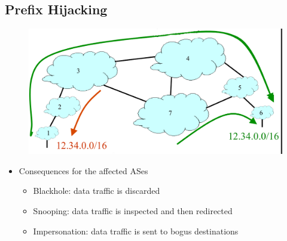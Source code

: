 \subsection{Prefix Hijacking}
\begin{figure}[H]
    \includegraphics[scale=0.5]{lazy/prefixhijacking.png}
\end{figure}
\begin{itemize}[nosep]
    \item Consequences for the affected ASes
          \begin{itemize}[nosep]
              \item Blackhole: data traffic is discarded
              \item Snooping: data traffic is inspected and then redirected
              \item Impersonation: data traffic is sent to bogus destinations
          \end{itemize}
\end{itemize}

